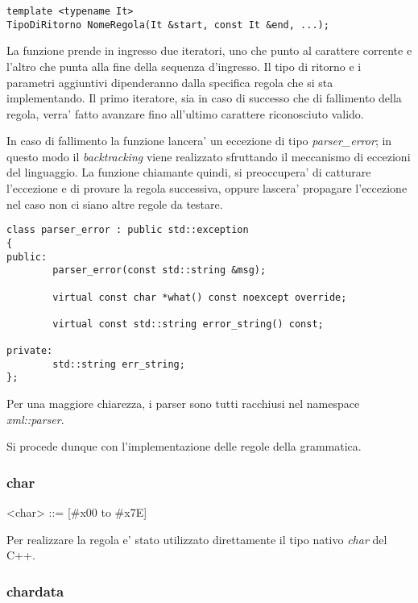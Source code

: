 \documentclass[italian,a4paper]{article}
\begin{document}
\begin{verbatim}
template <typename It>
TipoDiRitorno NomeRegola(It &start, const It &end, ...);
\end{verbatim}

La funzione prende in ingresso due iteratori, uno che punto al carattere
corrente e l'altro che punta alla fine della sequenza d'ingresso. Il tipo di
ritorno e i parametri aggiuntivi dipenderanno dalla specifica regola che si sta
implementando. Il primo iteratore, sia in caso di successo che di fallimento
della regola, verra' fatto avanzare fino all'ultimo carattere riconosciuto
valido.

In caso di fallimento la funzione lancera' un eccezione di tipo
\emph{parser_error}; in questo modo il \emph{backtracking} viene realizzato
sfruttando il meccanismo di eccezioni del linguaggio. La funzione chiamante
quindi, si preoccupera' di catturare l'eccezione e di provare la regola
successiva, oppure lascera' propagare l'eccezione nel caso non ci siano altre
regole da testare.

\begin{verbatim}
class parser_error : public std::exception
{
public:
        parser_error(const std::string &msg);

        virtual const char *what() const noexcept override;

        virtual const std::string error_string() const;

private:
        std::string err_string;
};
\end{verbatim}

Per una maggiore chiarezza, i parser sono tutti racchiusi nel namespace
\emph{xml::parser}.

Si procede dunque con l'implementazione delle regole della grammatica.

\subsubsection{char}

\begin{grammar}
	<char> ::= [\#x00 to \#x7E]
\end{grammar}

Per realizzare la regola  e' stato utilizzato direttamente il tipo
nativo \emph{char} del C++.

\subsubsection{chardata}
\end{document}
